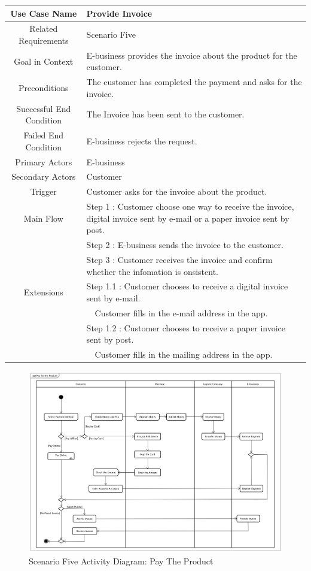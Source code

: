 \documentclass[12pt]{scrreprt}
\begin{document}
\begin{table}
  \centering
  \begin{tabular}{| c | p{11cm} |}
    \hline
    Use Case Name & Provide Invoice\\
    \hline
    Related Requirements & Scenario Five\\
    \hline
    Goal in Context & E-business provides the invoice about the product for
    the customer.\\
    \hline
    Preconditions & The customer has completed the payment and asks for
    the invoice.\\
    \hline
    Successful End Condition & The Invoice has been sent to the customer.\\
    \hline
    Failed End Condition & E-business rejects the request.\\
    \hline
    Primary Actors & E-business\\
    \hline
    Secondary Actors & Customer\\
    \hline
    Trigger & Customer asks for the invoice about the product.\\
    \hline
    Main Flow & Step 1 : Customer choose one way to receive the invoice,
    digital invoice sent by e-mail or a paper invoice sent by post.\\
    & Step 2 : E-business sends the invoice to the customer.\\
    & Step 3 : Customer receives the invoice and confirm whether
    the infomation is onsistent.\\
    \hline
    Extensions & Step 1.1 : Customer chooses to receive a digital invoice
    sent by e-mail.\\
    & \ \ Customer fills in the e-mail address in the app.\\
    & Step 1.2 : Customer chooses to receive a paper invoice sent by post.\\
    & \ \ Customer fills in the mailing address in the app.\\
    \hline
  \end{tabular}
\end{table}

\begin{figure}[H]
  \centering\includegraphics[width=6in]{DocumentRes/5PayTheProduct.png}
  \caption{Scenario Five Activity Diagram: Pay The Product}
\end{figure}
\end{document}
